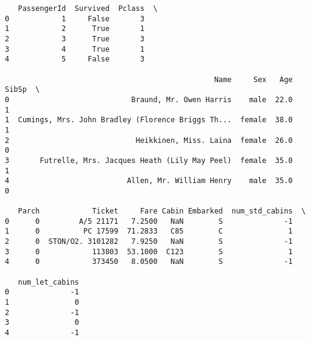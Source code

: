 \documentclass[11pt]{article}
\begin{document}
    
    \begin{verbatim}
   PassengerId  Survived  Pclass  \
0            1     False       3   
1            2      True       1   
2            3      True       3   
3            4      True       1   
4            5     False       3   

                                                Name     Sex   Age  SibSp  \
0                            Braund, Mr. Owen Harris    male  22.0      1   
1  Cumings, Mrs. John Bradley (Florence Briggs Th...  female  38.0      1   
2                             Heikkinen, Miss. Laina  female  26.0      0   
3       Futrelle, Mrs. Jacques Heath (Lily May Peel)  female  35.0      1   
4                           Allen, Mr. William Henry    male  35.0      0   

   Parch            Ticket     Fare Cabin Embarked  num_std_cabins  \
0      0         A/5 21171   7.2500   NaN        S              -1   
1      0          PC 17599  71.2833   C85        C               1   
2      0  STON/O2. 3101282   7.9250   NaN        S              -1   
3      0            113803  53.1000  C123        S               1   
4      0            373450   8.0500   NaN        S              -1   

   num_let_cabins  
0              -1  
1               0  
2              -1  
3               0  
4              -1  
    \end{verbatim}

    
    
\end{document}
